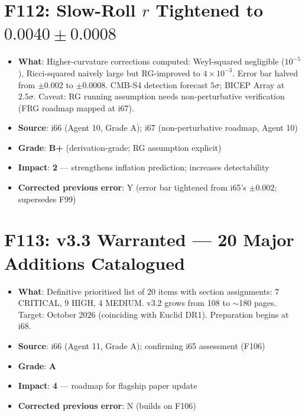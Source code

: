 \documentclass[11pt,a4paper]{article}
\newcommand{\grade}[1]{\textbf{#1}}
\newcommand{\impact}[1]{\textbf{#1}}
\begin{document}
\section{F112: Slow-Roll $r$ Tightened to $0.0040 \pm 0.0008$}
\begin{itemize}[nosep]
\item \textbf{What}: Higher-curvature corrections computed: Weyl-squared negligible ($10^{-5}$), Ricci-squared naively large but RG-improved to $4 \times 10^{-3}$. Error bar halved from $\pm 0.002$ to $\pm 0.0008$. CMB-S4 detection forecast $5\sigma$; BICEP Array at $2.5\sigma$. Caveat: RG running assumption needs non-perturbative verification (FRG roadmap mapped at i67).
\item \textbf{Source}: i66 (Agent 10, Grade A); i67 (non-perturbative roadmap, Agent 10)
\item \textbf{Grade}: \grade{B+} (derivation-grade; RG assumption explicit)
\item \textbf{Impact}: \impact{2} --- strengthens inflation prediction; increases detectability
\item \textbf{Corrected previous error}: Y (error bar tightened from i65's $\pm 0.002$; supersedes F99)
\end{itemize}

\section{F113: v3.3 Warranted --- 20 Major Additions Catalogued}
\begin{itemize}[nosep]
\item \textbf{What}: Definitive prioritised list of 20 items with section assignments: 7 CRITICAL, 9 HIGH, 4 MEDIUM. v3.2 grows from 108 to $\sim$180 pages. Target: October 2026 (coinciding with Euclid DR1). Preparation begins at i68.
\item \textbf{Source}: i66 (Agent 11, Grade A); confirming i65 assessment (F106)
\item \textbf{Grade}: \grade{A}
\item \textbf{Impact}: \impact{4} --- roadmap for flagship paper update
\item \textbf{Corrected previous error}: N (builds on F106)
\end{itemize}
\end{document}
